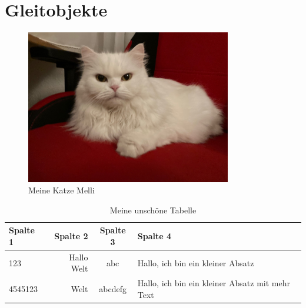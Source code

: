 \documentclass[ngerman,12pt,parskip=half]{scrreprt}
\begin{document}
\chapter{Gleitobjekte}

\blindtext[1]

\begin{figure}[h]
\begin{center}
\includegraphics[width=0.8\textwidth]{Bilder/Katze.jpg}
\caption{Meine Katze Melli}\label{fig:katzegl}
\end{center}
\end{figure}

\blindtext[5]

\begin{table}[htbp]
\begin{center}
\caption{Meine unschöne Tabelle}\label{tab:erstetabelle}
\begin{tabular}{lrcp{5cm}} \\ \toprule[2pt]
\textbf{Spalte 1} & \textbf{Spalte 2}  & \textbf{Spalte 3}  & \textbf{Spalte 4}  \\ \midrule[1pt]
123 & Hallo Welt & abc & Hallo, ich bin ein kleiner Absatz \\ 
4545123 & Welt & abcdefg & Hallo, ich bin ein kleiner Absatz mit mehr Text \\ \bottomrule[1pt]
\end{tabular}
\end{center}
\end{table}

\blindtext[10]
\end{document}

